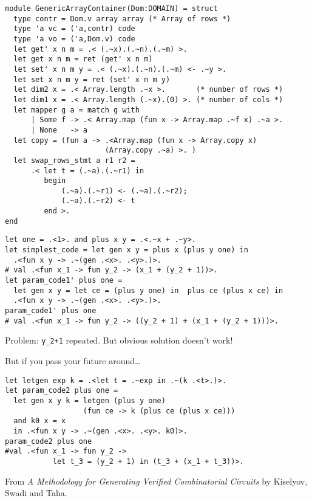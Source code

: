 \documentclass[landscape]{slides}
\begin{document}
\begin{slide}
\begin{verbatim}
module GenericArrayContainer(Dom:DOMAIN) = struct
  type contr = Dom.v array array (* Array of rows *)
  type 'a vc = ('a,contr) code
  type 'a vo = ('a,Dom.v) code
  let get' x n m = .< (.~x).(.~n).(.~m) >.
  let get x n m = ret (get' x n m)
  let set' x n m y = .< (.~x).(.~n).(.~m) <- .~y >.
  let set x n m y = ret (set' x n m y)
  let dim2 x = .< Array.length .~x >.       (* number of rows *)
  let dim1 x = .< Array.length (.~x).(0) >. (* number of cols *)
  let mapper g a = match g with
      | Some f -> .< Array.map (fun x -> Array.map .~f x) .~a >.
      | None   -> a
  let copy = (fun a -> .<Array.map (fun x -> Array.copy x) 
                       (Array.copy .~a) >. )
  let swap_rows_stmt a r1 r2 =
      .< let t = (.~a).(.~r1) in
         begin 
             (.~a).(.~r1) <- (.~a).(.~r2);
             (.~a).(.~r2) <- t
         end >.
end
\end{verbatim}
\end{slide}

\begin{slide}
\begin{verbatim}
let one = .<1>. and plus x y = .<.~x + .~y>.
let simplest_code = let gen x y = plus x (plus y one) in
  .<fun x y -> .~(gen .<x>. .<y>.)>.
# val .<fun x_1 -> fun y_2 -> (x_1 + (y_2 + 1))>.
let param_code1' plus one =
  let gen x y = let ce = (plus y one) in  plus ce (plus x ce) in
  .<fun x y -> .~(gen .<x>. .<y>.)>.
param_code1' plus one
# val .<fun x_1 -> fun y_2 -> ((y_2 + 1) + (x_1 + (y_2 + 1)))>.
\end{verbatim}
Problem: \verb=y_2+1= repeated.  But obvious solution doesn't work!
\end{slide}

\begin{slide}
    But if you pass your future around\dots
\begin{verbatim}
let letgen exp k = .<let t = .~exp in .~(k .<t>.)>.
let param_code2 plus one =
  let gen x y k = letgen (plus y one) 
                  (fun ce -> k (plus ce (plus x ce)))
  and k0 x = x
  in .<fun x y -> .~(gen .<x>. .<y>. k0)>.
param_code2 plus one
#val .<fun x_1 -> fun y_2 -> 
           let t_3 = (y_2 + 1) in (t_3 + (x_1 + t_3))>.
\end{verbatim}
From \textit{A Methodology for Generating Verified Combinatorial Circuits} by 
Kiselyov, Swadi and Taha.
\end{slide}
\end{document}
